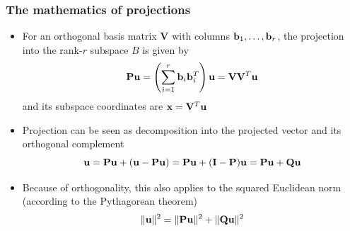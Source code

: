 \documentclass[t]{beamer} %
\begin{document}
\begin{frame}
  \frametitle{The mathematics of projections}

  \begin{itemize}
  \item For an orthogonal basis matrix $\mathbf{V}$ with columns
    $\vb_1, \ldots, \vb_r$, the projection into the rank-$r$ subspace $B$ is
    given by
    \[
      \mathbf{P}\vu = \left(\sum_{i=1}^r \vb_i \vb_i^T\right) \vu
      = \mathbf{V} \mathbf{V}^T \vu
    \]
    and its subspace coordinates are $\vx = \mathbf{V}^T \mathbf{u}$
  \item<2-> Projection can be seen as decomposition into the projected vector
    and its orthogonal complement
    \[
      \vu = \mathbf{P} \vu + (\vu - \mathbf{P} \vu)
      = \mathbf{P} \vu + (\mathbf{I} - \mathbf{P}) \vu
      = \mathbf{P} \vu + \mathbf{Q} \vu
    \]
  \item<3-> Because of orthogonality, this also applies to the squared
    Euclidean norm (according to the Pythagorean theorem)
    \[
      \norm{\vu}^2 = \norm{\mathbf{P} \vu}^2 + \norm{\mathbf{Q} \vu}^2
    \]
  \end{itemize}
\end{frame}
\end{document}
